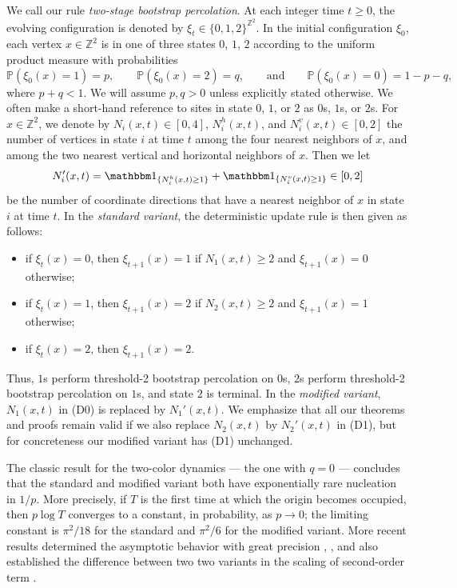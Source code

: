 \documentclass{article}
\renewcommand{\P}{\mathbb{P}}
\newcommand{\bZ}{{\mathbb Z}}
\numberwithin{equation}{section}
\begin{document}
We call our rule \textit{two-stage bootstrap percolation}. 
At each integer time $t\ge 0$, the evolving configuration is 
denoted by $\xi_t\in \{0,1,2\}^{\bZ^2}$.
In the initial configuration $\xi_0$, each vertex
$x\in\bZ^2$ is in one of three states $0$, $1$, $2$ 
according to the uniform 
product measure with probabilities
\begin{equation}
\label{eqn:initialconfiguration}
    \P(\xi_0(x) = 1) = p, \qquad \P(\xi_0(x) = 2) = q, \qquad  \text{and} \qquad \P(\xi_0(x) = 0) = 1 - p - q,
\end{equation}
where $p + q < 1$. We will assume $p,q>0$ unless explicitly stated otherwise.
We often make a short-hand reference to sites in state $0$, $1$, or $2$ as $0$s, $1$s, or $2$s. 
For $x\in\bZ^2$, we denote by $N_i(x,t)\in[0,4]$, 
$N_i^h(x,t)$, and $N_i^v(x,t)\in[0,2]$ the 
number of vertices in state $i$ at time $t$ among the four nearest 
neighbors of $x$, and among the two nearest vertical and 
horizontal neighbors of $x$. Then we let
$$
N_i'(x,t)=\mathbbm 1_{\{N_i^h(x,t)\ge 1\}}+\mathbbm 1_{\{N_i^v(x,t)\ge 1\}}\in [0,2] 
$$
be the 
number of coordinate directions that have a nearest neighbor of $x$ in state $i$ at time $t$. In the {\it standard variant\/}, 
the deterministic update rule is then given as follows:
\begin{itemize}
\item[(D0)] if $\xi_t(x)=0$, then $\xi_{t+1}(x)=1$ if $N_1(x,t)\ge 2$ and $\xi_{t+1}(x)=0$ otherwise; 
\item[(D1)] if $\xi_t(x)=1$, then $\xi_{t+1}(x)=2$ if $N_2(x,t)\ge 2$ and $\xi_{t+1}(x)=1$ otherwise;
\item[(D2)] if $\xi_t(x)=2$, then $\xi_{t+1}(x)=2$.
\end{itemize}
Thus, $1$s perform threshold-2 bootstrap percolation on $0$s, $2$s perform threshold-2 bootstrap percolation on $1$s, and state $2$ is terminal. 
In the {\it modified variant\/}, $N_1(x,t)$ in (D0) is replaced by 
$N_1'(x,t)$. We emphasize that all our theorems and proofs remain valid 
if we also replace $N_2(x,t)$ by 
$N_2'(x,t)$ in (D1), but for concreteness our 
modified variant has (D1) unchanged.

The classic result \cite{Holroyd2003} 
for the two-color dynamics --- the one with $q=0$ --- 
concludes
that the standard and modified variant both have exponentially rare nucleation in $1/p$. More precisely, if $T$ is the first time at which the 
origin becomes occupied, then $p\log T$ converges to a constant, in probability, as $p\to 0$; the limiting constant is $\pi^2/18$ for the 
standard and $\pi^2/6$ for the modified variant. More recent results determined the asymptotic behavior with great precision \cite{Hartarsky2019},
\cite{Hartarsky2024},
and also established the difference between two two variants in the scaling of second-order term \cite{Hartarsky2023}. 
\end{document}
